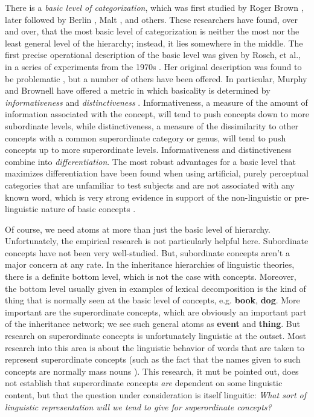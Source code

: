 \documentclass[12pt]{amsart}
\begin{document}
There is a \emph{basic level of categorization}, which was first studied by Roger Brown \cite{brown_how_1958}, later followed by Berlin \cite{berlin_ethnobiological_1992}, Malt \cite{malt_category_1995}, and others. These researchers have found, over and over, that the most basic level of categorization is neither the most nor the least general level of the hierarchy; instead, it lies somewhere in the middle. The first precise operational description of the basic level was given by Rosch, et al., in a series of experiments from the 1970s \cite{rosch_structural_1976} \cite{rosch_principles_1978}. Her original description was found to be problematic \cite{murphy_cue_1982}, but a number of others have been offered. In particular, Murphy and Brownell have offered a metric in which basicality is determined by \emph{informativeness} and \emph{distinctiveness} \cite{murphy_category_1985}. Informativeness, a measure of the amount of information associated with the concept, will tend to push concepts down to more subordinate levels, while distinctiveness, a measure of the dissimilarity to other concepts with a common superordinate category or genus, will tend to push concepts up to more superordinate levels. Informativeness and distinctiveness combine into \emph{differentiation}. The most robust advantages for a basic level that maximizes differentiation have been found when using artificial, purely perceptual categories that are unfamiliar to test subjects and are not associated with any known word, which is very strong evidence in support of the non-linguistic or pre-linguistic nature of basic concepts \cite[pg. 220]{murphy_big_2002}.

Of course, we need atoms at more than just the basic level of hierarchy. Unfortunately, the empirical research is not particularly helpful here. Subordinate concepts have not been very well-studied. But, subordinate concepts aren't a major concern at any rate. In the inheritance hierarchies of linguistic theories, there is a definite bottom level, which is not the case with concepts. Moreover, the bottom level usually given in examples of lexical decomposition is the kind of thing that is normally seen at the basic level of concepts, e.g. {\bf book}, {\bf dog}. More important are the superordinate concepts, which are obviously an important part of the inheritance network; we see such general atoms as {\bf event} and {\bf thing}. But research on superordinate concepts is unfortunately linguistic at the outset. Most research into this area is about the linguistic behavior of words that are taken to represent superordinate concepts (such as the fact that the names given to such concepts are normally mass nouns \cite{markman_why_1985}). This research, it mut be pointed out, does not establish that superordinate concepts \emph{are} dependent on some linguistic content, but that the question under consideration is itself linguitic: \emph{What sort of linguistic representation will we tend to give for superordinate concepts?}
\end{document}
